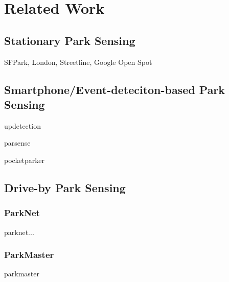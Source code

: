 \chapter{Related Work}
\label{chap:relatedwork}

\section{Stationary Park Sensing}

SFPark, London, Streetline, Google Open Spot


\section{Smartphone/Event-deteciton-based Park Sensing}


updetection\cite{Ma:2014:USP:2674918.2674929}

parsense \cite{Nawaz:2013:PSB:2500423.2500438}

pocketparker \cite{Nandugudi:2014:PPP:2632048.2632098}


\section{Drive-by Park Sensing}

\subsection{ParkNet}
\label{sec:parknet}

parknet... \cite{Mathur:2010:PDS:1814433.1814448}

\subsection{ParkMaster}
 
parkmaster \cite{Grassi:2017:PIE:3132211.3134452}
